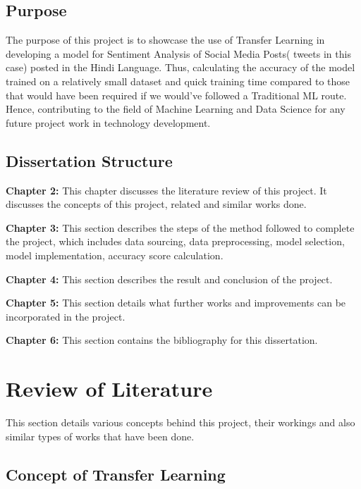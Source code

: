 \documentclass[a4paper, 12pt]{article}
\begin{document}
\begin{sloppypar}
\subsection{Purpose}

The purpose of this project is to showcase the use of Transfer Learning in developing a model for Sentiment Analysis of Social Media Posts( tweets in this case) posted in the Hindi Language. Thus, calculating the accuracy of the model trained on a relatively small dataset and quick training time compared to those that would have been required if we would've followed a Traditional ML route. Hence, contributing to the field of Machine Learning and Data Science for any future project work in technology development.

\subsection{Dissertation Structure}
\textbf{Chapter 2:} This chapter discusses the literature review of this project. It discusses the concepts of this project, related and similar works done.

\textbf{Chapter 3:} This section describes the steps of the method followed to complete the project, which includes data sourcing, data preprocessing, model selection, model implementation, accuracy score calculation.

\textbf{Chapter 4:} This section describes the result and conclusion of the project.

\textbf{Chapter 5:} This section details what further works and improvements can be incorporated in the project.

\textbf{Chapter 6:} This section contains the bibliography for this dissertation.
\clearpage

\section {Review of Literature}

This section details various concepts behind this project, their workings and also similar types of works that have been done.

\subsection{Concept of Transfer Learning}


\end{sloppypar}
\end{document}
